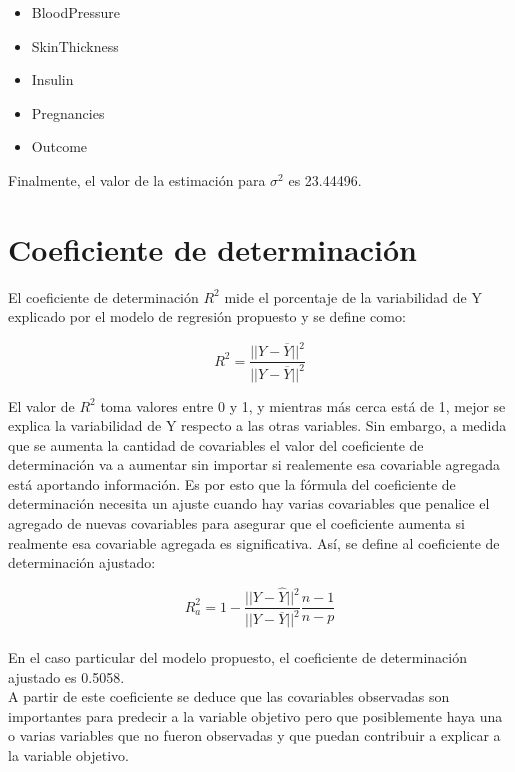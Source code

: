 \documentclass{article}
\begin{document}
\begin{itemize}
\item BloodPressure
\item SkinThickness
\item Insulin
\item Pregnancies
\item Outcome
\end{itemize}

\noindent
Finalmente, el valor de la estimación para \(\sigma^2\) es 23.44496.





\section{Coeficiente de determinación}

El coeficiente de determinación \(R^2\) mide el porcentaje de la variabilidad de Y explicado por el modelo de regresión propuesto y se define como:

$$R^2 = \frac{||\hat{Y} - \overline{Y}||^2}{||Y - \overline{Y}||^2}$$

\noindent
El valor de \(R^2\) toma valores entre 0 y 1, y mientras más cerca está de 1, mejor se explica la variabilidad de Y respecto a las otras variables. Sin embargo, a medida que se aumenta la cantidad de covariables el valor del coeficiente de determinación va a aumentar sin importar si realemente esa covariable agregada está aportando información. Es por esto que la fórmula del coeficiente de determinación necesita un ajuste cuando hay varias covariables que penalice el agregado de nuevas covariables para asegurar que el coeficiente aumenta si realmente esa covariable agregada es significativa. Así, se define al coeficiente de determinación ajustado:

$$R_a^2 = 1- \frac{||Y - \hat{Y}||^2}{||Y - \overline{Y}||^2} \frac{n - 1}{n - p}$$\\

\noindent
En el caso particular del modelo propuesto, el coeficiente de determinación ajustado es 0.5058.\\

\noindent
A partir de este coeficiente se deduce que las covariables observadas son importantes para predecir a la variable objetivo pero que posiblemente haya una o varias variables que no fueron observadas y que puedan contribuir a explicar a la variable objetivo.
\end{document}
